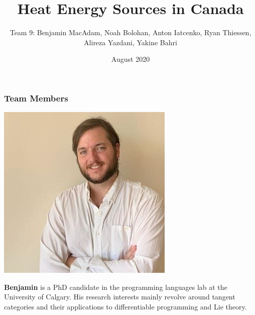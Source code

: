 \documentclass{beamer}
\title{Heat Energy Sources in Canada}
\author[Team 9]{Team 9: Benjamin MacAdam, Noah Bolohan, Anton Iatcenko, Ryan Thiessen, Alireza Yazdani, Yakine Bahri}
\institute[]{Math\textsuperscript{Industry}}
\date{August 2020}
\begin{document}
\frame{\titlepage}


\begin{frame}
\frametitle{Team Members}

\begin{minipage}[c]{0.15\textwidth}
\includegraphics[width=\textwidth, trim={25pt 0pt 0pt 0pt}, clip]{TeamPics/Ben.jpg}
\end{minipage}\hspace{0.05\textwidth}%
\begin{minipage}[c]{0.8\textwidth}
{\small \textbf{Benjamin} is a PhD candidate in the programming languages lab at the University of Calgary. His research interests mainly revolve around tangent categories and their applications to differentiable programming and Lie theory. }
\end{minipage}


\end{frame}
\end{document}

